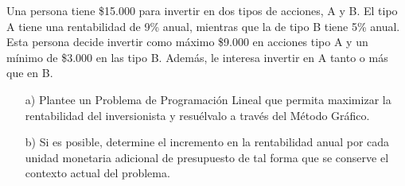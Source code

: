 \documentclass[letterpaper,11pt,oneside]{article}
\begin{document}
Una persona tiene \$15.000 para invertir en dos tipos de acciones, A y B. El tipo A tiene una rentabilidad de 9\% anual, mientras que la de tipo B tiene 5\% anual. Esta persona decide invertir como máximo \$9.000 en acciones tipo A y un mínimo de \$3.000 en las tipo B. Además, le interesa invertir en A tanto o más que en B.

\begin{itemize}
	\item[a)] Plantee un Problema de Programación Lineal que permita maximizar la rentabilidad del inversionista y resuélvalo a través del Método Gráfico.
	\item[b)] Si es posible, determine el incremento en la rentabilidad anual por cada unidad monetaria adicional de presupuesto de tal forma que se conserve el contexto actual del problema.
\end{itemize}
\end{document}

